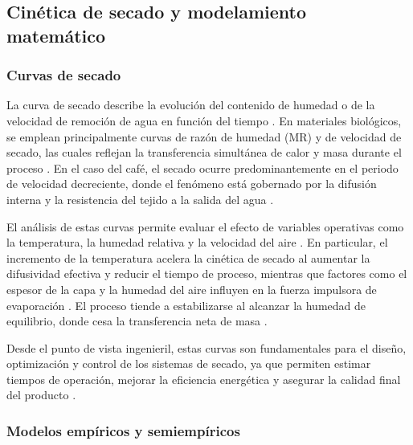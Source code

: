 \subsection{Cinética de secado y modelamiento matemático}

\subsubsection{Curvas de secado}

La curva de secado describe la evolución del contenido de humedad o de la velocidad de remoción de agua en función del tiempo \parencite{hadibi_effect_2025, yu_current_2025}. En materiales biológicos, se emplean principalmente curvas de razón de humedad (MR) y de velocidad de secado, las cuales reflejan la transferencia simultánea de calor y masa durante el proceso \parencite{guemouni_convective_2022, geng_thermodynamically_2023}. En el caso del café, el secado ocurre predominantemente en el periodo de velocidad decreciente, donde el fenómeno está gobernado por la difusión interna y la resistencia del tejido a la salida del agua \parencite{fernando_effect_2025, alves_physiological_2017}.

El análisis de estas curvas permite evaluar el efecto de variables operativas como la temperatura, la humedad relativa y la velocidad del aire \parencite{abdissa_harmonizing_2023, phitakwinai_thinlayer_2019}. En particular, el incremento de la temperatura acelera la cinética de secado al aumentar la difusividad efectiva y reducir el tiempo de proceso, mientras que factores como el espesor de la capa y la humedad del aire influyen en la fuerza impulsora de evaporación \parencite{fauzi_influence_2024, phitakwinai_thinlayer_2019}. El proceso tiende a estabilizarse al alcanzar la humedad de equilibrio, donde cesa la transferencia neta de masa \parencite{cruz-ospina_improving_2026}.

Desde el punto de vista ingenieril, estas curvas son fundamentales para el diseño, optimización y control de los sistemas de secado, ya que permiten estimar tiempos de operación, mejorar la eficiencia energética y asegurar la calidad final del producto \parencite{fernando_effect_2025, ordonez-lozano_monitoring_2025}.

\subsubsection{Modelos empíricos y semiempíricos}

